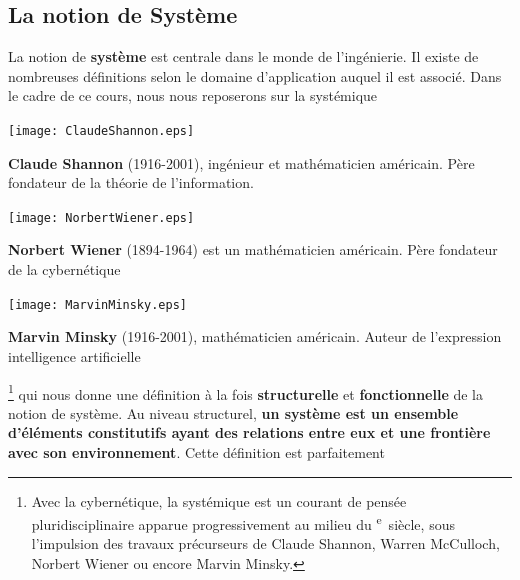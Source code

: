 \subsection{La notion de Système}
La notion de \textbf{système} est centrale dans le monde de l'ingénierie.
Il existe de nombreuses définitions selon le domaine 
d'application auquel il est associé. Dans le cadre de ce cours, nous nous 
reposerons sur la systémique
\begin{marginfigure}
    \centering
    \texttt{[image: ClaudeShannon.eps]}
    \caption*{\textbf{Claude Shannon} (1916-2001), ingénieur et 
              mathématicien américain. 
              Père fondateur de la théorie de l'information.}
\end{marginfigure}
\begin{marginfigure}
    \centering
    \texttt{[image: NorbertWiener.eps]}
    \caption*{\textbf{Norbert Wiener} (1894-1964) est un mathématicien 
              américain. Père fondateur de la cybernétique}
\end{marginfigure}
\begin{marginfigure}
    \centering
    \texttt{[image: MarvinMinsky.eps]}
    \caption*{\textbf{Marvin Minsky} (1916-2001), mathématicien américain. 
              Auteur de l'expression \og intelligence artificielle\fg}
\end{marginfigure}
\footnote{Avec la cybernétique, la systémique est 
un courant de pensée pluridisciplinaire apparue progressivement au milieu du 
\textsc{}\textsuperscript{e}~siècle, sous l'impulsion des 
travaux précurseurs de Claude Shannon, 
Warren McCulloch, 
Norbert Wiener 
ou encore Marvin Minsky.} 
qui nous donne une définition à la fois \textbf{structurelle} et 
\textbf{fonctionnelle} de la notion de système.
Au niveau structurel, \textbf{un système est un ensemble 
d'éléments constitutifs ayant des relations entre eux et 
une frontière avec son environnement}. Cette définition est parfaitement
